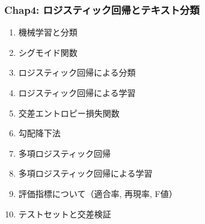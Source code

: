 \documentclass[unicode,11pt]{beamer} %
\begin{document}

\begin{frame}
    \frametitle{Chap4: ロジスティック回帰とテキスト分類}
    \begin{block}{}
        \begin{enumerate}
            \item 機械学習と分類
            \item シグモイド関数
            \item ロジスティック回帰による分類
            \item ロジスティック回帰による学習
            \item 交差エントロピー損失関数
            \item 勾配降下法
            \item 多項ロジスティック回帰
            \item 多項ロジスティック回帰による学習
            \item 評価指標について（適合率, 再現率, F値）
            \item テストセットと交差検証
        \end{enumerate}
    \end{block}
\end{frame}

\end{document}
